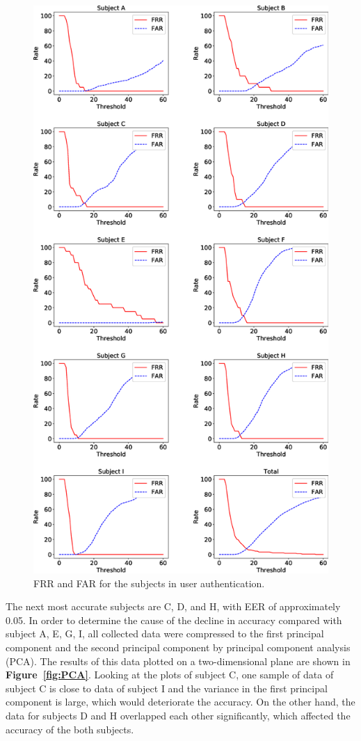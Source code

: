 \documentclass[sigchi,authordraft]{acmart}
\newcommand\figref[1]{\textbf{Figure~\ref{fig:#1}}}
\begin{document}
\begin{figure}[!t]
  \centering
    \includegraphics[width=1\linewidth]{figure/EER.eps}
  \caption{FRR and FAR for the subjects in user authentication.}
  \label{fig:EER}
\end{figure}

The next most accurate subjects are C, D, and H, with EER of approximately 0.05. In order to determine the cause of the decline in accuracy compared with subject A, E, G, I, all collected data were compressed to the first principal component and the second principal component by principal component analysis (PCA). The results of this data plotted on a two-dimensional plane are shown in \figref{PCA}. Looking at the plots of subject C, one sample of data of subject C is close to data of subject I and the variance in the first principal component is large, which would deteriorate the accuracy. On the other hand, the data for subjects D and H overlapped each other significantly, which affected the accuracy of the both subjects.\par
\end{document}
